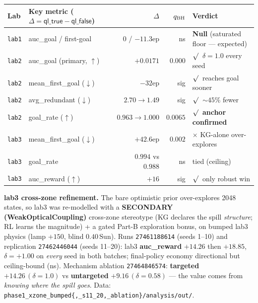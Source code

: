 \documentclass[10pt,a4paper]{article}
\newcommand{\file}[1]{\texttt{\small #1}}
\newcommand{\kw}[1]{\textbf{#1}}
\providecommand{\checkmark}{\ensuremath{\surd}}
\newcommand{\good}{\textcolor{green!55!black}{\checkmark}}
\begin{document}
\begin{center}\footnotesize
\begin{tabular}{@{}llrrl@{}}
\toprule
\rowcolor{boxgrey} Lab & Key metric (\(\Delta=\textsf{ql\_true}-\textsf{ql\_false}\)) & \(\Delta\) & \(q_{\rm BH}\) & Verdict\\
\midrule
\file{lab1} & auc\_goal / first-goal & \(0\) / \(-11.3\)ep & ns & \kw{Null} (saturated floor — expected)\\
\midrule
\file{lab2} & auc\_goal (primary, \(\uparrow\)) & \(+0.0171\) & \(0.000\) & \good\ \(\delta=1.0\) every seed\\
\file{lab2} & mean\_first\_goal (\(\downarrow\)) & \(-32\)ep & sig & \good\ reaches goal sooner\\
\file{lab2} & avg\_redundant (\(\downarrow\)) & \(2.70\!\to\!1.49\) & sig & \good\ \(\sim45\%\) fewer\\
\file{lab2} & goal\_rate (\(\uparrow\)) & \(0.963\!\to\!1.000\) & \(0.0065\) & \good\ \kw{anchor confirmed}\\
\midrule
\file{lab3} & mean\_first\_goal (\(\downarrow\)) & \(+42.6\)ep & \(0.002\) & \(\times\) KG-alone over-explores\\
\file{lab3} & goal\_rate & \(0.994\) vs \(0.988\) & ns & tied (ceiling)\\
\file{lab3} & auc\_reward (\(\uparrow\)) & \(+16\) & sig & \good\ only robust win\\
\bottomrule
\end{tabular}
\end{center}

\kw{lab3 cross-zone refinement.} The bare optimistic prior over-explores 2048 states, so lab3 was
re-modelled with a \kw{SECONDARY (WeakOpticalCoupling)} cross-zone stereotype (KG declares the spill
\emph{structure}; RL learns the magnitude) + a gated Part-B exploration bonus, on bumped lab3 physics
(lamp \(+150\), blind \(0.40\,\text{Sun}\)). Runs \texttt{27461188614} (seeds 1--10) and replication
\texttt{27462446044} (seeds 11--20): lab3 \kw{auc\_reward} \(+14.26\) then \(+18.85\), \(\delta=+1.00\)
on \emph{every} seed in both batches; final-policy economy directional but ceiling-bound (ns).
Mechanism ablation \texttt{27464846574}: \kw{targeted} \(+14.26\,(\delta{=}1.0)\) vs \kw{untargeted}
\(+9.16\,(\delta{=}0.58)\) — the value comes from \emph{knowing where the spill goes}.
Data: \file{phase1\_xzone\_bumped\{,\_s11\_20,\_ablation\}/analysis/out/}.
\end{document}
